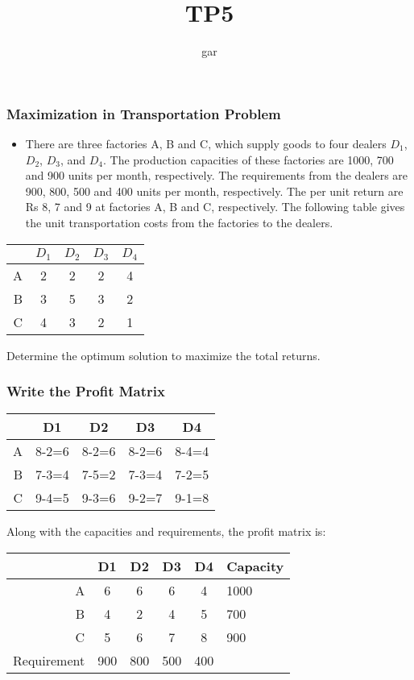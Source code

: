 \documentclass{beamer}
\title{TP5}
\author{gar}
\date{}
\begin{document}
\maketitle

\begin{frame}
  \frametitle{Maximization in Transportation Problem}
  \begin{itemize}
  \item There are three factories A, B and C, which supply goods to four dealers $D_1$, $D_2$, $D_3$, and $D_4$. The production capacities of these factories are 1000, 700 and 900 units per month, respectively. The requirements from the dealers are 900, 800, 500 and 400 units per month, respectively. The per unit return are Rs 8, 7 and 9 at factories A, B and C, respectively. The following table gives the unit transportation costs from the factories to the dealers. 
  \end{itemize}
  \begin{center}
  \begin{tabular}{|r|cccc|}
\hline
      & $D_1$ & $D_2$ & $D_3$ & $D_4$ \\
\hline
    A & 2  & 2  & 2  & 4  \\ 
    B & 3  & 5  & 3  & 2  \\
    C & 4  & 3  & 2  & 1 \\
\hline
  \end{tabular}
\end{center}
Determine the optimum solution to maximize the total returns.
\end{frame}

\begin{frame}
  \frametitle{Write the Profit Matrix}
    \begin{center}
  \begin{tabular}{|r|cccc|}
\hline
            & D1    & D2    & D3    & D4             \\
\hline
    A       & 8-2=6 & 8-2=6 & 8-2=6 & 8-4=4          \\ 
    B       & 7-3=4 & 7-5=2 & 7-3=4 & 7-2=5          \\
    C       & 9-4=5 & 9-3=6 & 9-2=7 & 9-1=8          \\
\hline
  \end{tabular}
\end{center}
Along with the capacities and requirements, the profit matrix is:
    \begin{center}
  \begin{tabular}{|r|cccc|l|}
\hline
            & D1    & D2    & D3    & D4  & Capacity \\
\hline
    A       & 6     & 6     & 6     & 4   & 1000     \\ 
    B       & 4     & 2     & 4     & 5   & 700      \\
    C       & 5     & 6     & 7     & 8   & 900      \\
\hline
Requirement & 900   & 800   & 500   & 400 & \\
\hline
  \end{tabular}
\end{center}
\end{frame}
\end{document}
